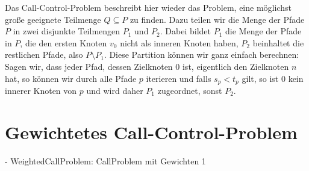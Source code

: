 \documentclass[11pt]{article}
\theoremstyle{definition}
\theoremstyle{theorem}
\theoremstyle{theorem}
\begin{document}
    Das Call-Control-Problem beschreibt hier wieder das Problem, eine möglichst große geeignete Teilmenge
    $Q \subseteq P$ zu finden.
    Dazu teilen wir die Menge der Pfade $P$ in zwei disjunkte Teilmengen $P_1$ und $P_2$.
    Dabei bildet $P_1$ die Menge der Pfade in $P$, die den ersten Knoten $v_0$ nicht als inneren Knoten haben, $P_2$
    beinhaltet die restlichen Pfade, also $P \setminus P_1$.
    Diese Partition können wir ganz einfach berechnen:
    Sagen wir, dass jeder Pfad, dessen Zielknoten $0$ ist, eigentlich den Zielknoten $n$ hat, so können wir durch alle
    Pfade $p$ iterieren und falls $s_p < t_p$ gilt, so ist $0$ kein innerer Knoten von $p$ und wird daher $P_1$
    zugeordnet, sonst $P_2$.












    \section{Gewichtetes Call-Control-Problem}\label{sec:weiteres}
    - WeightedCallProblem: CallProblem mit Gewichten 1
\end{document}
